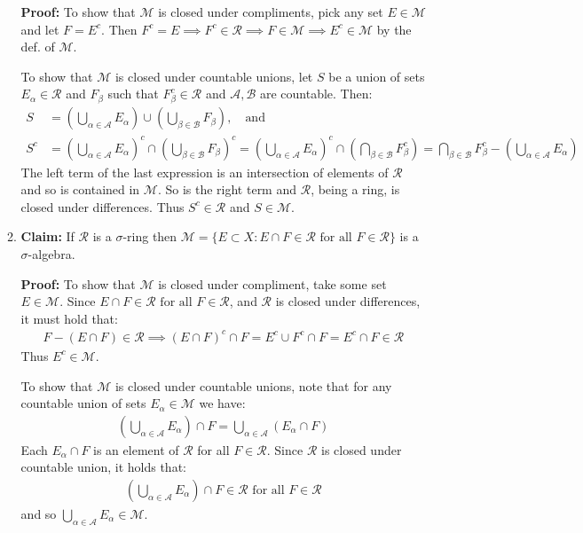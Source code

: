 \documentclass[11pt,letter]{article}
\begin{document}
\begin{enumerate}
\begin{enumerate}
        \textbf{Proof:} To show that $\mathcal{M}$ is closed under compliments, pick any set $E \in \mathcal{M}$ and let $F = E^c$. Then $F^c = E \implies F^c \in \mathcal{R} \implies F \in \mathcal{M} \implies E^c \in \mathcal{M}$ by the def. of $\mathcal{M}$.

        To show that $\mathcal{M}$ is closed under countable unions, let $S$ be a union of sets $E_\alpha \in \mathcal{R}$ and $F_\beta$ such that $F^c_\beta \in \mathcal{R}$ and $\mathcal{A}, \mathcal{B}$ are countable. Then:
        \begin{align*}
        S & = (\bigcup\limits_{\alpha \in \mathcal{A}} E_\alpha) \cup (\bigcup\limits_{\beta \in \mathcal{B}} F_\beta), \quad \text{and} \\
        S^c & = (\bigcup\limits_{\alpha \in \mathcal{A}} E_\alpha)^c \cap (\bigcup\limits_{\beta \in \mathcal{B}} F_\beta)^c = (\bigcup\limits_{\alpha \in \mathcal{A}} E_\alpha)^c \cap (\bigcap\limits_{\beta \in \mathcal{B}} F_\beta^c) = \bigcap\limits_{\beta \in \mathcal{B}} F_\beta^c - (\bigcup\limits_{\alpha \in \mathcal{A}} E_\alpha)
        \end{align*}
        The left term of the last expression is an intersection of elements of $\mathcal{R}$ and so is contained in $\mathcal{M}$. So is the right term and $\mathcal{R}$, being a ring, is closed under differences. Thus $S^c \in \mathcal{R}$ and $S \in \mathcal{M}$.

        \item \textbf{Claim:} If $\mathcal{R}$ is a $\sigma$-ring then $\mathcal{M} = \{E \subset X : E \cap F \in \mathcal{R} \text{ for all } F \in \mathcal{R}\}$ is a $\sigma$-algebra.

        \textbf{Proof:} To show that $\mathcal{M}$ is closed under compliment, take some set $E \in \mathcal{M}$. Since $E \cap F \in \mathcal{R} \text{ for all } F \in \mathcal{R}$, and $\mathcal{R}$ is closed under differences, it must hold that:
        \begin{align*}
            F - (E \cap F) \in \mathcal{R} \implies (E \cap F)^c \cap F = E^c \cup F^c \cap F = E^c \cap F \in \mathcal{R}
        \end{align*}
        Thus $E^c \in \mathcal{M}$.

        To show that $\mathcal{M}$ is closed under countable unions, note that for any countable union of sets $E_\alpha \in \mathcal{M}$ we have:
        \begin{align*}
            (\bigcup\limits_{\alpha \in \mathcal{A}} E_\alpha) \cap F = \bigcup\limits_{\alpha \in \mathcal{A}} (E_\alpha \cap F)
        \end{align*}
        Each $E_\alpha \cap F$ is an element of $\mathcal{R}$ for all $F \in \mathcal{R}$. Since $\mathcal{R}$ is closed under countable union, it holds that:
        \begin{align*}
            (\bigcup\limits_{\alpha \in \mathcal{A}} E_\alpha) \cap F \in \mathcal{R} \text{ for all } F \in \mathcal{R}
        \end{align*}
        and so $\bigcup\limits_{\alpha \in \mathcal{A}} E_\alpha \in \mathcal{M}$.
    \end{enumerate}


\end{enumerate}
\end{document}
